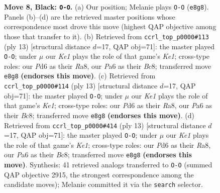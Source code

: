 \documentclass[11pt]{article}
\begin{document}
\begin{figure}[p]
\caption{\textbf{Move 8, Black: \texttt{O-O}.} (a) Our position; Melanie plays \texttt{O-O} (\texttt{e8g8}). Panels (b)--(d) are the retrieved master positions whose correspondence most drove this move (highest QAP objective among those that transfer to it). (b) Retrieved from \texttt{ccrl\_top\_p0000\#113} (ply 13) [structural distance $d$=17, QAP obj=71]: the master played \texttt{O-O}; under $\mu$ our \emph{Ke1} plays the role of that game's \emph{Ke1}; cross-type roles: our \emph{P}d6 as their \emph{R}a8, our \emph{P}a6 as their \emph{B}c8; transferred move \texttt{e8g8} \textbf{(endorses this move)}. (c) Retrieved from \texttt{ccrl\_top\_p0000\#114} (ply 13) [structural distance $d$=17, QAP obj=71]: the master played \texttt{O-O}; under $\mu$ our \emph{Ke1} plays the role of that game's \emph{Ke1}; cross-type roles: our \emph{P}d6 as their \emph{R}a8, our \emph{P}a6 as their \emph{B}c8; transferred move \texttt{e8g8} \textbf{(endorses this move)}. (d) Retrieved from \texttt{ccrl\_top\_p0000\#414} (ply 13) [structural distance $d$=17, QAP obj=71]: the master played \texttt{O-O}; under $\mu$ our \emph{Ke1} plays the role of that game's \emph{Ke1}; cross-type roles: our \emph{P}d6 as their \emph{R}a8, our \emph{P}a6 as their \emph{B}c8; transferred move \texttt{e8g8} \textbf{(endorses this move)}. Synthesis: 41 retrieved analogs transferred to \texttt{O-O} (summed QAP objective 2915, the strongest correspondence among the candidate moves); Melanie committed it via the \texttt{search} selector.}
\label{fig:thought-m15}
\end{figure}

\clearpage
\end{document}

